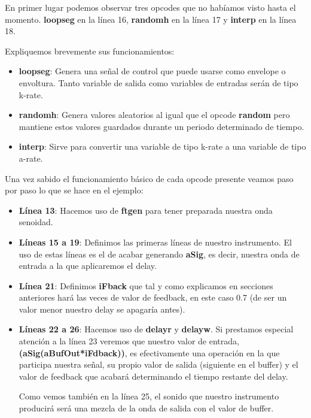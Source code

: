 En primer lugar podemos observar tres opcodes que no habíamos visto hasta el momento. \textbf{loopseg} en la línea 16, \textbf{randomh} en la línea 17 y \textbf{interp} en la línea 18. 

Expliquemos brevemente sus funcionamientos:

\begin{itemize}
 \item \textbf{loopseg}: Genera una señal de control que puede usarse como envelope o envoltura. Tanto variable de salida como variables de entradas serán de tipo k-rate.
 \item \textbf{randomh}: Genera valores aleatorios al igual que el opcode \textbf{random} pero mantiene estos valores guardados durante un periodo determinado de tiempo.
 \item \textbf{interp}: Sirve para convertir una variable de tipo k-rate a una variable de tipo a-rate.
\end{itemize}

Una vez sabido el funcionamiento básico de cada opcode presente veamos paso por paso lo que  se hace en el ejemplo:

\begin{itemize}
 \item \textbf{Línea 13}: Hacemos uso de \textbf{ftgen} para tener preparada nuestra onda senoidad.
 \item \textbf{Líneas 15 a 19}: Definimos las primeras líneas de nuestro instrumento. El uso de estas líneas es el de acabar generando \textbf{aSig}, es decir, nuestra onda de entrada a la que aplicaremos el delay.
 \item \textbf{Línea 21}: Definimos \textbf{iFback} que tal y como explicamos en secciones anteriores hará las veces de valor de feedback, en este caso 0.7 (de ser un valor menor nuestro delay se apagaría antes).
 \item \textbf{Líneas 22 a 26}: Hacemos uso de \textbf{delayr} y \textbf{delayw}. Si prestamos especial atención a la línea 23 veremos que nuestro valor de entrada, \textbf{(aSig(aBufOut*iFdback))}, es efectivamente una operación en la que participa nuestra señal, su propio valor de salida (siguiente en el buffer) y el valor de feedback que acabará determinando el tiempo restante del delay.
 
 Como vemos también en la línea 25, el sonido que nuestro instrumento producirá será una mezcla de la onda de salida con el valor de buffer.
\end{itemize}


